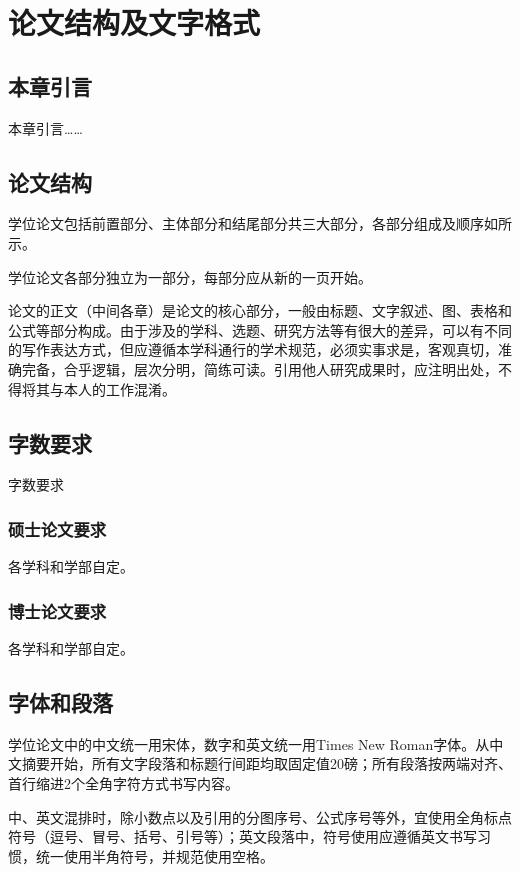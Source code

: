 


\chapter{论文结构及文字格式}
\thispagestyle{others}
\pagestyle{others}
\xiaosi

\section{本章引言}

本章引言……

\section{论文结构}

学位论文包括前置部分、主体部分和结尾部分共三大部分，各部分组成及顺序如所示。

学位论文各部分独立为一部分，每部分应从新的一页开始。

论文的正文（中间各章）是论文的核心部分，一般由标题、文字叙述、图、表格和公式等部分构成。由于涉及的学科、选题、研究方法等有很大的差异，可以有不同的写作表达方式，但应遵循本学科通行的学术规范，必须实事求是，客观真切，准确完备，合乎逻辑，层次分明，简练可读。引用他人研究成果时，应注明出处，不得将其与本人的工作混淆。


\section{字数要求}
字数要求


\subsection{硕士论文要求}

各学科和学部自定。

\subsection{博士论文要求}

各学科和学部自定。

\section{字体和段落}
学位论文中的中文统一用宋体，数字和英文统一用Times New Roman字体。从中文摘要开始，所有文字段落和标题行间距均取固定值20磅；所有段落按两端对齐、首行缩进2个全角字符方式书写内容。

中、英文混排时，除小数点以及引用的分图序号、公式序号等外，宜使用全角标点符号（逗号、冒号、括号、引号等）；英文段落中，符号使用应遵循英文书写习惯，统一使用半角符号，并规范使用空格。

